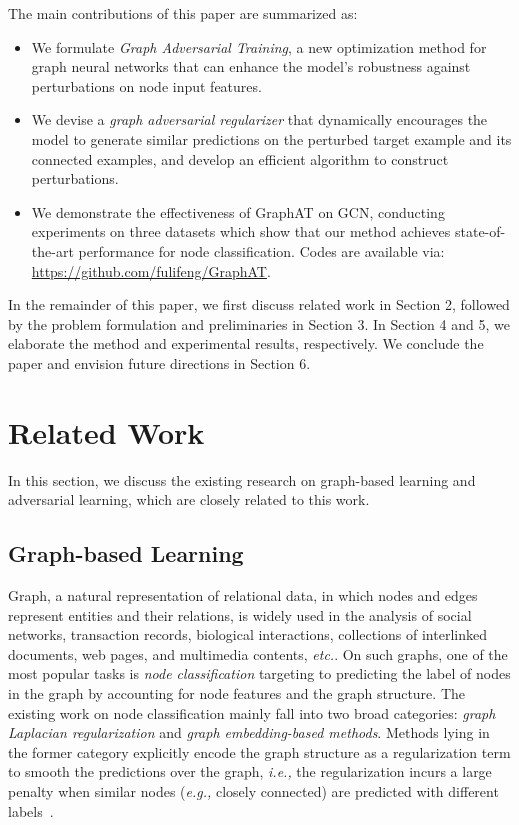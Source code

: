 \documentclass[10pt,journal,compsoc]{IEEEtran}
\newcommand{\ie}{\emph{i.e., }}
\newcommand{\eg}{\emph{e.g., }}
\newcommand{\etc}{\emph{etc.}}
\begin{document}
The main contributions of this paper are summarized as:
\begin{itemize}[leftmargin=*]
    \item We formulate \textit{Graph Adversarial Training}, a new optimization method for graph neural networks that can enhance the model's robustness against perturbations on node input features. 
\item We devise a \textit{graph adversarial regularizer} that dynamically encourages the model to generate similar predictions on the perturbed target example and its connected examples, and develop an efficient algorithm to construct perturbations.
    \item We demonstrate the effectiveness of GraphAT on GCN, conducting experiments on three datasets which show that our method achieves state-of-the-art performance for node classification. Codes are available via: \url{https://github.com/fulifeng/GraphAT}. 
\end{itemize}

In the remainder of this paper, we first discuss related work in Section 2, followed by the problem formulation and preliminaries in Section 3. In Section 4 and 5, we elaborate the method and experimental results, respectively. We conclude the paper and envision future directions in Section 6. \section{Related Work}
In this section, we discuss the existing research on graph-based learning and adversarial learning, which are closely related to this work.
\subsection{Graph-based Learning}
Graph, a natural representation of relational data, in which nodes and edges represent entities and their relations, is widely used in the analysis of social networks, transaction records, biological interactions, collections of interlinked documents, web pages, and multimedia contents, \etc. On such graphs, one of the most popular tasks is \textit{node classification} targeting to predicting the label of nodes in the graph by accounting for node features and the graph structure. The existing work on node classification mainly fall into two broad categories: \textit{graph Laplacian regularization} and \textit{graph embedding-based methods}. Methods lying in the former category explicitly encode the graph structure as a regularization term to smooth the predictions over the graph, \ie the regularization incurs a large penalty when similar nodes (\eg closely connected) are predicted with different labels~\cite{zhu2003semi,zhou2004learning,belkin2006manifold,talukdar2009new,feng2018learning}. 
\end{document}
